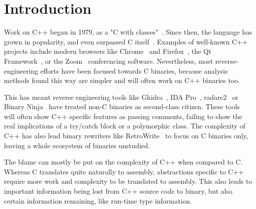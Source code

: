 \documentclass[a4paper,11pt,oneside]{report}
\begin{document}
\maketoc

\chapter{Introduction}



Work on C++ began in 1979, as a "C with classes"~\cite{cwithclasses}.
Since then, the language has grown in popularity, and even surpassed C 
itself~\cite{stackoverflowpopularity}.
Examples of well-known C++ projects include modern browsers like 
Chrome~\cite{chrome} and Firefox~\cite{firefox}, the Qt Framework~\cite{qt}, or 
the Zoom~\cite{zoom} conferencing software.
Nevertheless, most reverse-engineering efforts have been focused towards C
binaries, because analysis methods found this way are simpler and will often
work on C++ binaries too.

This has meant reverse engineering tools like Ghidra~\cite{ghidra}, IDA 
Pro~\cite{ida}, radare2~\cite{radare} or Binary Ninja~\cite{binja} have
treated non-C binaries as second-class citizen.
These tools will often show C++ specific features as passing comments, failing 
to show the real implications of a try/catch block or a polymorphic class.
The complexity of C++ has also lead binary rewriters like
RetroWrite~\cite{dinesh20oakland} to focus on C binaries only, leaving a whole
ecosystem of binaries unstudied.

The blame can mostly be put on the complexity of C++ when compared to C.
Whereas C translates quite naturally to assembly, abstractions specific to C++ 
require more work and complexity to be translated to assembly.
This also leads to important information being lost from C++ source code to 
binary, but also certain information remaining, like run-time type information.
\end{document}
